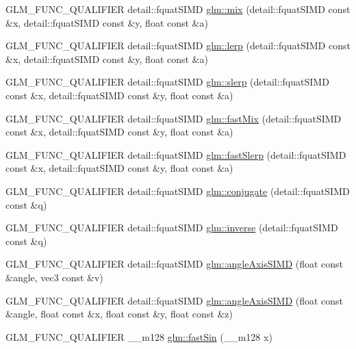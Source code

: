 \begin{DoxyCompactItemize}
\item 
G\+L\+M\+\_\+\+F\+U\+N\+C\+\_\+\+Q\+U\+A\+L\+I\+F\+I\+E\+R detail\+::fquat\+S\+I\+M\+D \hyperlink{namespaceglm_a1539ad90a9eb88f535d9dfacba04c1c9}{glm\+::mix} (detail\+::fquat\+S\+I\+M\+D const \&x, detail\+::fquat\+S\+I\+M\+D const \&y, float const \&a)
\item 
G\+L\+M\+\_\+\+F\+U\+N\+C\+\_\+\+Q\+U\+A\+L\+I\+F\+I\+E\+R detail\+::fquat\+S\+I\+M\+D \hyperlink{namespaceglm_a4d8cd3fe0165431fb1c54cbeb432bf26}{glm\+::lerp} (detail\+::fquat\+S\+I\+M\+D const \&x, detail\+::fquat\+S\+I\+M\+D const \&y, float const \&a)
\item 
G\+L\+M\+\_\+\+F\+U\+N\+C\+\_\+\+Q\+U\+A\+L\+I\+F\+I\+E\+R detail\+::fquat\+S\+I\+M\+D \hyperlink{namespaceglm_a40d5134f42aaa1511518d2abe97e0ebc}{glm\+::slerp} (detail\+::fquat\+S\+I\+M\+D const \&x, detail\+::fquat\+S\+I\+M\+D const \&y, float const \&a)
\item 
G\+L\+M\+\_\+\+F\+U\+N\+C\+\_\+\+Q\+U\+A\+L\+I\+F\+I\+E\+R detail\+::fquat\+S\+I\+M\+D \hyperlink{namespaceglm_acf0fe775efd8a75dc6dc603efd157231}{glm\+::fast\+Mix} (detail\+::fquat\+S\+I\+M\+D const \&x, detail\+::fquat\+S\+I\+M\+D const \&y, float const \&a)
\item 
G\+L\+M\+\_\+\+F\+U\+N\+C\+\_\+\+Q\+U\+A\+L\+I\+F\+I\+E\+R detail\+::fquat\+S\+I\+M\+D \hyperlink{namespaceglm_a57c9ec50932abd564671a28cd7ba53e0}{glm\+::fast\+Slerp} (detail\+::fquat\+S\+I\+M\+D const \&x, detail\+::fquat\+S\+I\+M\+D const \&y, float const \&a)
\item 
G\+L\+M\+\_\+\+F\+U\+N\+C\+\_\+\+Q\+U\+A\+L\+I\+F\+I\+E\+R detail\+::fquat\+S\+I\+M\+D \hyperlink{namespaceglm_a079af2a66c2439c64053382e8c98f213}{glm\+::conjugate} (detail\+::fquat\+S\+I\+M\+D const \&q)
\item 
G\+L\+M\+\_\+\+F\+U\+N\+C\+\_\+\+Q\+U\+A\+L\+I\+F\+I\+E\+R detail\+::fquat\+S\+I\+M\+D \hyperlink{namespaceglm_ad723ad1f3ef20438ade0e0c95002f187}{glm\+::inverse} (detail\+::fquat\+S\+I\+M\+D const \&q)
\item 
G\+L\+M\+\_\+\+F\+U\+N\+C\+\_\+\+Q\+U\+A\+L\+I\+F\+I\+E\+R detail\+::fquat\+S\+I\+M\+D \hyperlink{namespaceglm_a635900a97b69fe25d76c029f130a1c8f}{glm\+::angle\+Axis\+S\+I\+M\+D} (float const \&angle, vec3 const \&v)
\item 
G\+L\+M\+\_\+\+F\+U\+N\+C\+\_\+\+Q\+U\+A\+L\+I\+F\+I\+E\+R detail\+::fquat\+S\+I\+M\+D \hyperlink{namespaceglm_a8ae8890bd658ce7217abc2112e3dca35}{glm\+::angle\+Axis\+S\+I\+M\+D} (float const \&angle, float const \&x, float const \&y, float const \&z)
\item 
G\+L\+M\+\_\+\+F\+U\+N\+C\+\_\+\+Q\+U\+A\+L\+I\+F\+I\+E\+R \+\_\+\+\_\+m128 \hyperlink{namespaceglm_a81de908720e51f26e86e18d37aa5cc3b}{glm\+::fast\+Sin} (\+\_\+\+\_\+m128 x)
\end{DoxyCompactItemize}


